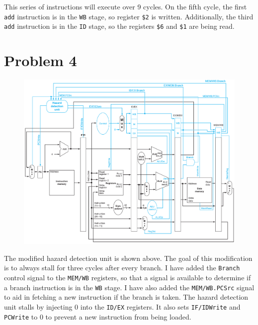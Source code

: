 \documentclass[12pt]{article}
\begin{document}
This series of instructions will execute over 9 cycles. On the fifth cycle, the first \texttt{add} instruction is in the \texttt{WB} stage, so register \texttt{\$2} is
written. Additionally, the third \texttt{add} instruction is in the \texttt{ID} stage, so the registers \texttt{\$6} and \texttt{\$1} are being read.

\section*{Problem 4}

\begin{figure}[!ht]
        \hspace*{-4cm}
        \begin{center}
                \includegraphics[width=5in]{problem4.png}
        \end{center}
        \hspace*{-4cm}
\end{figure}

The modified hazard detection unit is shown above. The goal of this modification is to always stall for three cycles after every branch.
I have added the \texttt{Branch} control signal to the \texttt{MEM/WB} registers, so that a signal is available to determine if a branch instruction
is in the \texttt{WB} stage. I have also added the \texttt{MEM/WB.PCSrc} signal to aid in fetching a new instruction if the branch is taken. The hazard detection
unit stalls by injecting 0 into the \texttt{ID/EX} registers. It also sets \texttt{IF/IDWrite} and \texttt{PCWrite} to 0 to prevent a new instruction
from being loaded.
\end{document}
